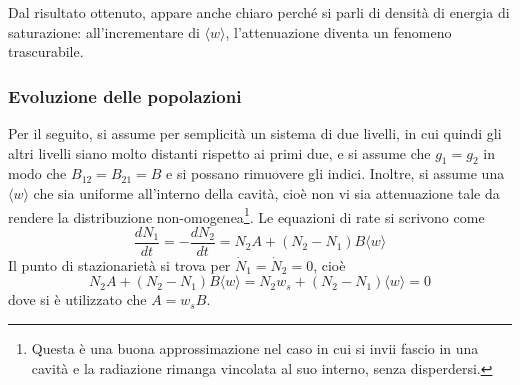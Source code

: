 \documentclass[11pt, a4paper]{scrartcl}
\theoremstyle{style}
\numberwithin{equation}{subsection}
\begin{document}
\noindent Dal risultato ottenuto, appare anche chiaro perch\'e si parli di densit\`a di energia di saturazione: all'incrementare di $\langle w \rangle$, l'attenuazione diventa un fenomeno trascurabile.

\subsubsection{Evoluzione delle popolazioni}

Per il seguito, si assume per semplicit\`a un sistema di due livelli, in cui quindi gli altri livelli siano molto distanti rispetto ai primi due, e si assume che $g_1 = g_2$ in modo che $B_{12} = B_{21} = B$ e si possano rimuovere gli indici.
Inoltre, si assume una $\langle w \rangle$ che sia uniforme all'interno della cavit\`a, cio\`e non vi sia attenuazione tale da rendere la distribuzione non-omogenea\footnote{Questa \`e una buona approssimazione nel caso in cui si invii fascio in una cavit\`a e la radiazione rimanga vincolata al suo interno, senza disperdersi.}.
Le equazioni di rate si scrivono come
\[
\frac{d N_1}{d t} = - \frac{d N_2}{d t}  = N_2 A + (N_2 - N_1) B \langle w \rangle
\] 
Il punto di stazionariet\`a si trova per $\dot{N}_1 = \dot{N}_2 = 0$, cio\`e 
\[
N_2 A + (N_2 - N_1) B \langle w \rangle = N_2 w_s + (N_2-N_1) \langle w \rangle = 0 
\] 
dove si \`e utilizzato che $A = w_s B$. 
\end{document}
